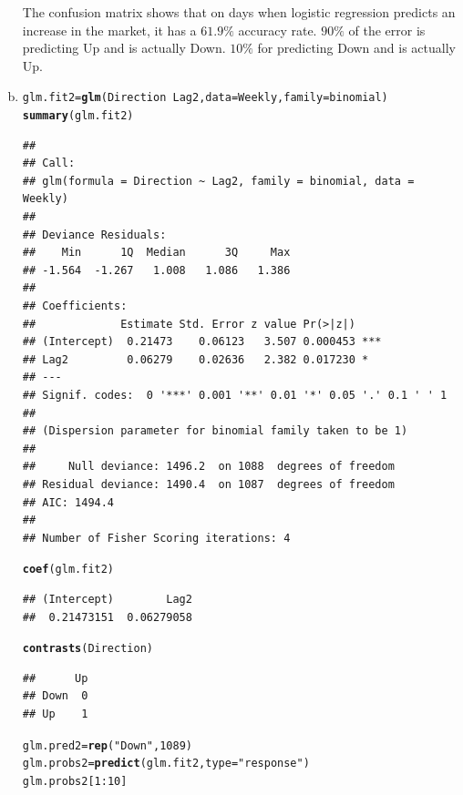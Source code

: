 \documentclass{article}\usepackage[]{graphicx}\usepackage[]{color}
\makeatletter
\newcommand{\hlnum}[1]{\textcolor[rgb]{0.686,0.059,0.569}{#1}}%
\newcommand{\hlstr}[1]{\textcolor[rgb]{0.192,0.494,0.8}{#1}}%
\newcommand{\hlopt}[1]{\textcolor[rgb]{0,0,0}{#1}}%
\newcommand{\hlstd}[1]{\textcolor[rgb]{0.345,0.345,0.345}{#1}}%
\newcommand{\hlkwb}[1]{\textcolor[rgb]{0.69,0.353,0.396}{#1}}%
\newcommand{\hlkwc}[1]{\textcolor[rgb]{0.333,0.667,0.333}{#1}}%
\newcommand{\hlkwd}[1]{\textcolor[rgb]{0.737,0.353,0.396}{\textbf{#1}}}%
\newenvironment{kframe}{%
 \def\at@end@of@kframe{}%
 \ifinner\ifhmode%
  \def\at@end@of@kframe{\end{minipage}}%
  \begin{minipage}{\columnwidth}%
 \fi\fi%
 \def\FrameCommand##1{\hskip\@totalleftmargin \hskip-\fboxsep
 \colorbox{shadecolor}{##1}\hskip-\fboxsep
     \hskip-\linewidth \hskip-\@totalleftmargin \hskip\columnwidth}%
 \MakeFramed {\advance\hsize-\width
   \@totalleftmargin\z@ \linewidth\hsize
   \@setminipage}}%
 {\par\unskip\endMakeFramed%
 \at@end@of@kframe}
\newenvironment{knitrout}{}{} %
\makeatother
\begin{document}
\begin{enumerate}[(a)]
The confusion matrix shows that on days when logistic regression predicts an increase in the market, it has a $61.9\%$ accuracy rate. $90\%$ of the error is predicting Up and is actually Down. $10\%$ for predicting Down and is actually Up.

\item
\begin{knitrout}
\color{fgcolor}\begin{kframe}
\begin{alltt}
\hlstd{glm.fit2}\hlkwb{=}\hlkwd{glm}\hlstd{(Direction}\hlopt{~}\hlstd{Lag2,}\hlkwc{data}\hlstd{=Weekly,} \hlkwc{family} \hlstd{= binomial)}
\hlkwd{summary}\hlstd{(glm.fit2)}
\end{alltt}
\begin{verbatim}
## 
## Call:
## glm(formula = Direction ~ Lag2, family = binomial, data = Weekly)
## 
## Deviance Residuals: 
##    Min      1Q  Median      3Q     Max  
## -1.564  -1.267   1.008   1.086   1.386  
## 
## Coefficients:
##             Estimate Std. Error z value Pr(>|z|)    
## (Intercept)  0.21473    0.06123   3.507 0.000453 ***
## Lag2         0.06279    0.02636   2.382 0.017230 *  
## ---
## Signif. codes:  0 '***' 0.001 '**' 0.01 '*' 0.05 '.' 0.1 ' ' 1
## 
## (Dispersion parameter for binomial family taken to be 1)
## 
##     Null deviance: 1496.2  on 1088  degrees of freedom
## Residual deviance: 1490.4  on 1087  degrees of freedom
## AIC: 1494.4
## 
## Number of Fisher Scoring iterations: 4
\end{verbatim}
\begin{alltt}
\hlkwd{coef}\hlstd{(glm.fit2)}
\end{alltt}
\begin{verbatim}
## (Intercept)        Lag2 
##  0.21473151  0.06279058
\end{verbatim}
\begin{alltt}
\hlkwd{contrasts}\hlstd{(Direction)}
\end{alltt}
\begin{verbatim}
##      Up
## Down  0
## Up    1
\end{verbatim}
\begin{alltt}
\hlstd{glm.pred2}\hlkwb{=}\hlkwd{rep}\hlstd{(}\hlstr{"Down"}\hlstd{,} \hlnum{1089}\hlstd{)}
\hlstd{glm.probs2}\hlkwb{=}\hlkwd{predict}\hlstd{(glm.fit2,}\hlkwc{type}\hlstd{=}\hlstr{"response"}\hlstd{)}
\hlstd{glm.probs2[}\hlnum{1}\hlopt{:}\hlnum{10}\hlstd{]}
\end{alltt}
\begin{verbatim}

\end{verbatim}
\end{kframe}
\end{knitrout}
\end{enumerate}
\end{document}

